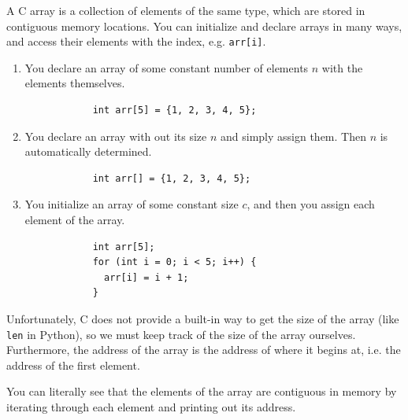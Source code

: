 \documentclass{article}
\newcounter{definition}[section]
\begin{document}
    \begin{definition}[Array]
      \label{def:array}
      A C array is a collection of elements of the same type, which are stored in contiguous memory locations. You can initialize and declare arrays in many ways, and access their elements with the index, e.g. \texttt{arr[i]}.
      \begin{enumerate}
        \item You declare an array of some constant number of elements $n$ with the elements themselves. 
          \begin{lstlisting} 
            int arr[5] = {1, 2, 3, 4, 5}; 
          \end{lstlisting}
        \item You declare an array with out its size $n$ and simply assign them. Then $n$ is automatically determined. 
          \begin{lstlisting} 
            int arr[] = {1, 2, 3, 4, 5}; 
          \end{lstlisting}
        \item You initialize an array of some constant size $c$, and then you assign each element of the array. 
          \begin{lstlisting} 
            int arr[5]; 
            for (int i = 0; i < 5; i++) {
              arr[i] = i + 1; 
            }
          \end{lstlisting}
      \end{enumerate}
      Unfortunately, C does not provide a built-in way to get the size of the array (like \texttt{len} in Python), so we must keep track of the size of the array ourselves. Furthermore, the address of the array is the address of where it begins at, i.e. the address of the first element. 
    \end{definition}

    You can literally see that the elements of the array are contiguous in memory by iterating through each element and printing out its address. 
\end{document}

